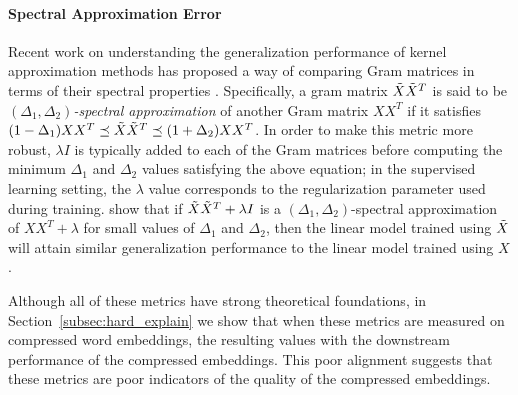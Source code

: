 
\paragraph{Spectral Approximation Error}
Recent work on understanding the generalization performance of kernel approximation methods has proposed a way of comparing Gram matrices in terms of their spectral properties \citep{avron17,lprff18}.
Specifically, a gram matrix $\tX\tX^T$ is said to be \textit{$(\Delta_1,\Delta_2)$-spectral approximation} of another Gram matrix $XX^T$ if it satisfies $(1-\Delta_1) XX^T \preceq \tX\tX^T \preceq (1+\Delta_2)XX^T$.
In order to make this metric more robust, $\lambda I$ is typically added to each of the Gram matrices before computing the minimum $\Delta_1$ and $\Delta_2$ values satisfying the above equation;
in the supervised learning setting, the $\lambda$ value corresponds to the regularization parameter used during training.
\citet{lprff18} show that if $\tX\tX^T+\lambda I$ is a $(\Delta_1,\Delta_2)$-spectral approximation of $XX^T + \lambda$ for small values of $\Delta_1$ and $\Delta_2$, then the linear model trained using $\tX$ will attain similar generalization performance to the linear model trained using $X$.

Although all of these metrics have strong theoretical foundations, in Section~\ref{subsec:hard_explain} we show that when these metrics are measured on compressed word embeddings, the resulting values  with the downstream performance of the compressed embeddings.
This poor alignment suggests that these metrics are poor indicators of the quality of the compressed embeddings.

